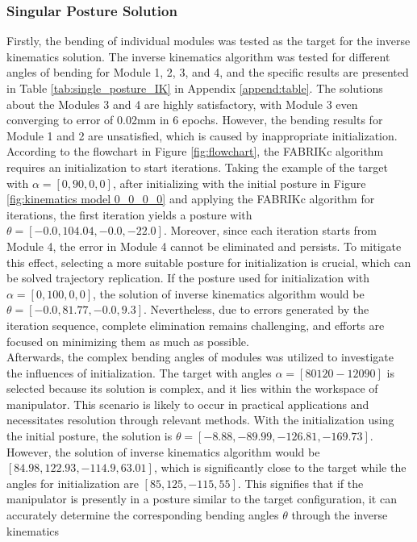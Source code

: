 \subsubsection{Singular Posture Solution}
Firstly, the bending of individual modules was tested as the target for the inverse kinematics solution. The 
inverse kinematics algorithm was tested for different angles of bending for Module 1, 2, 3, and 4, and the 
specific results are presented in Table \ref{tab:single_posture_IK} in Appendix \ref{append:table}. The 
solutions about the Modules 3 and 4 are highly satisfactory, with Module 3 even converging to error of 0.02mm 
in 6 epochs. However, the bending results for Module 1 and 2 are unsatisfied, which is caused by inappropriate 
initialization. According to the flowchart in Figure \ref{fig:flowchart}, the FABRIKc algorithm requires an 
initialization to start iterations. Taking the example of the target with $\alpha = [0, 90, 0, 0]$, after 
initializing with the initial posture in Figure \ref{fig:kinematics model 0_0_0_0} and applying the FABRIKc 
algorithm for iterations, the first iteration yields a posture with $ \theta = [-0.0, 104.04, -0.0, -22.0]$. 
Moreover, since each iteration starts from Module 4, the error in Module 4 cannot be eliminated and persists. 
To mitigate this effect, selecting a more suitable posture for initialization is crucial, which can be solved 
trajectory replication. If the posture used for initialization with $\alpha = [0, 100, 0, 0]$, the solution of 
inverse kinematics algorithm would be $\theta = [-0.0, 81.77, -0.0, 9.3]$. Nevertheless, due to errors generated 
by the iteration sequence, complete elimination remains challenging, and efforts are focused on minimizing them 
as much as possible. \\
Afterwards, the complex bending angles of modules was utilized to investigate the influences of initialization. 
The target with angles $\alpha = [80 120 -120 90]$ is selected because its solution is complex, and it lies 
within the workspace of manipulator. This scenario is likely to occur in practical applications and necessitates 
resolution through relevant methods. With the initialization using the initial posture, the solution is $\theta = 
[-8.88, -89.99, -126.81, -169.73]$. However, the solution of inverse kinematics algorithm would be 
$[84.98, 122.93, -114.9, 63.01]$, which is significantly close to the target while the angles for initialization 
are $[85, 125, -115, 55]$. This signifies that if the manipulator is presently in a posture similar to the target 
configuration, it can accurately determine the corresponding bending angles $\theta$ through the inverse kinematics 
